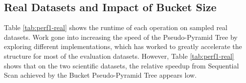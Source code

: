 \subsection{Real Datasets and Impact of Bucket Size}

\begin{table}
	\centering

	\caption{Total Execution Time (in seconds) of Each Operation on Real Datasets}
	\label{tab:perf1-real}
\end{table}

Table \ref{tab:perf1-real} shows the runtime of each operation on sampled real datasets. Work gone into increasing the speed of the Pseudo-Pyramid Tree by exploring different implementations, which has worked to greatly accelerate the structure for most of the evaluation datasets. However, Table \ref{tab:perf1-real} shows that on the two scientific datasets, the relative speedup from Sequential Scan achieved by the Bucket Pseudo-Pyramid Tree appears low.

